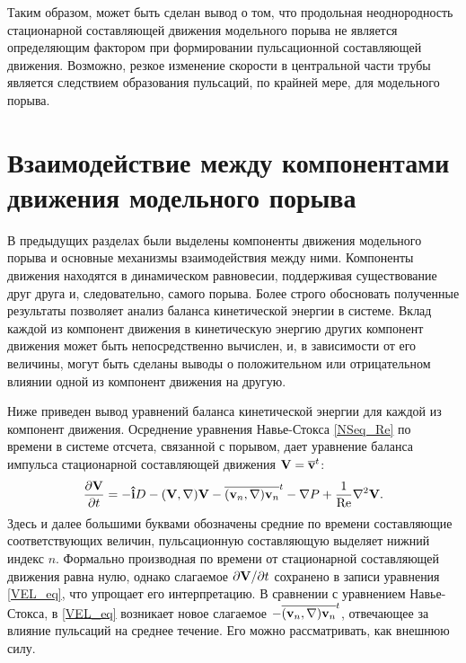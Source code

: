 Таким образом, может быть сделан вывод о том, что продольная неоднородность стационарной составляющей движения модельного порыва не является определяющим фактором при формировании пульсационной составляющей движения. Возможно, резкое изменение скорости в центральной части трубы является следствием образования пульсаций, по крайней мере, для модельного порыва. 


\section{Взаимодействие между компонентами движения модельного порыва}

В предыдущих разделах были выделены компоненты движения модельного порыва и основные механизмы взаимодействия между ними. Компоненты движения находятся в динамическом равновесии, поддерживая существование друг друга и, следовательно, самого порыва. Более строго обосновать полученные результаты позволяет анализ баланса кинетической энергии в системе. Вклад каждой из компонент движения в кинетическую энергию других компонент движения может быть непосредственно вычислен, и, в зависимости от его величины, могут быть сделаны выводы о положительном или отрицательном влиянии одной из компонент движения на другую. 

Ниже приведен вывод уравнений баланса кинетической энергии для каждой из компонент движения. 
Осреднение уравнения Навье-Стокса \eqref{NSeq_Re} по времени в системе отсчета, связанной с порывом, дает уравнение баланса импульса стационарной составляющей движения $\mathbf{V} = \overline{\mathbf{v}}^t$:
\begin{equation} \label{VEL_eq}
\frac{\partial \mathbf{V}}{\partial t} =  - \mathbf{\hat{i}} D - (\mathbf{V}, \nabla) \mathbf{V} - \overline{(\mathbf{v}_n, \nabla) \mathbf{v}_n}^t - \nabla P + \frac{1}{\operatorname{Re}} \nabla^2 \mathbf{V}.
\end{equation}
Здесь и далее большими буквами обозначены средние по времени составляющие соответствующих величин, пульсационную составляющую выделяет нижний индекс $n$. Формально производная по времени от стационарной составляющей движения равна нулю, однако слагаемое $\partial \mathbf{V}/ \partial t$ сохранено в записи уравнения \eqref{VEL_eq}, что упрощает его интерпретацию. В сравнении с уравнением Навье-Стокса, в \eqref{VEL_eq} возникает новое слагаемое $-\overline{(\mathbf{v}_n, \nabla) \mathbf{v}_n}^t$, отвечающее за влияние пульсаций на среднее течение. Его можно рассматривать, как внешнюю силу. 

